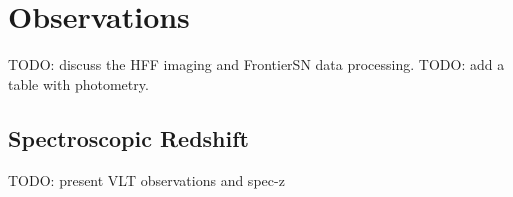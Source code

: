 \section{Observations}\label{sec:Observations}

TODO: discuss the HFF imaging and FrontierSN data processing. 
TODO: add a table with photometry.

\subsection{Spectroscopic Redshift}

TODO: present VLT observations and spec-z


  